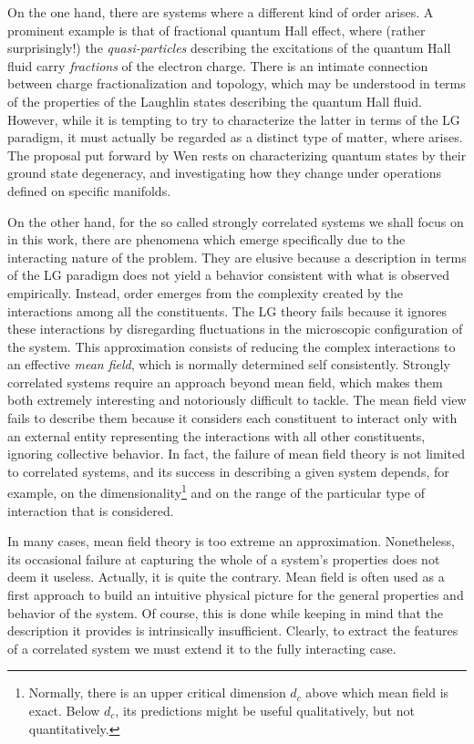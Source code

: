 On the one hand, there are systems where a different kind of order arises.
A prominent example is that of fractional quantum Hall effect, where (rather surprisingly!) the \emph{quasi-particles} describing the excitations of the quantum Hall fluid carry \emph{fractions} of the electron charge.
There is an intimate connection between charge fractionalization and topology, which may be understood in terms of the properties of the Laughlin states describing the quantum Hall fluid. However, while it is tempting to try to characterize the latter in terms of the \acs{LG} paradigm, it must actually be regarded as a distinct type of matter, where  arises.
The proposal put forward by Wen \cite{wen_topological_1990} rests on characterizing quantum states by their ground state degeneracy, and investigating how they change under operations defined on specific manifolds. 

On the other hand, for the so called strongly correlated systems we shall focus on in this work, there are phenomena which emerge specifically due to the interacting nature of the problem.
They are elusive because a description in terms of the \acs{LG} paradigm does not yield a behavior consistent with what is observed empirically.
Instead, order emerges from the complexity created by the interactions among all the constituents.
The \acs{LG} theory fails because it ignores these interactions by disregarding fluctuations in the microscopic configuration of the system.
This approximation consists of reducing the complex interactions to an effective \emph{mean field}, which is normally determined self consistently.
Strongly correlated systems require an approach beyond mean field, which makes them both extremely interesting and notoriously difficult to tackle.
The mean field view fails to describe them because it considers each constituent to interact only with an external entity representing the interactions with all other constituents, ignoring collective behavior.
In fact, the failure of mean field theory is not limited to correlated systems, and its success in describing a given system depends, for example, on the dimensionality\footnote{Normally, there is an upper critical dimension $d_c$ above which mean field is exact. Below $d_c$, its predictions might be useful qualitatively, but not quantitatively.} and on the range of the particular type of interaction that is considered.

In many cases, mean field theory is too extreme an approximation.
Nonetheless, its occasional failure at capturing the whole of a system's properties does not deem it  useless.
Actually, it is quite the contrary.
Mean field is often used as a first approach to build an intuitive physical picture for the general properties and behavior of the system.
Of course, this is done while keeping in mind that the description it provides is intrinsically insufficient.
Clearly, to extract the features of a correlated system we must extend it to the fully interacting case.